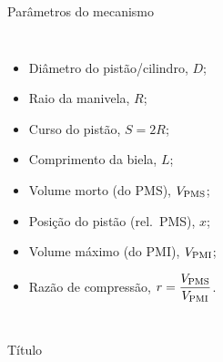     \begin{frame}{Parâmetros do mecanismo}\vspace*{-2em}
        \begin{columns}
        \begin{itemize}
            \item<1-> \alert{Diâmetro} do pistão/cilindro, \alert{$D$};
            \item<2-> \alert{Raio} da manivela, \alert{$R$};
            \item<3-> \alert{Curso} do pistão, \alert{$S = 2R$};
            \item<4-> \alert{Comprimento} da biela, \alert{$L$};
            \item<5-> \alert{Volume} morto (do PMS), \alert{${V_{\mathrm{PMS}}}$};
            \item<6-> \alert{Posição} do pistão (rel.~PMS), \alert{$x$};
            \item<7-> \alert{Volume} máximo (do PMI), \alert{${V_{\mathrm{PMI}}}$};
            \item<8-> \alert{Razão de compressão}, \alert{$r = \dfrac{{V_{\mathrm{PMS}}}}{{V_{\mathrm{PMI}}}}$}.
        \end{itemize}
        \begin{center}
        \end{center}
        \end{columns}
    \end{frame}

    \begin{frame}{Título}\vspace*{-2em}
        \begin{columns}
        \end{columns}
    \end{frame}

